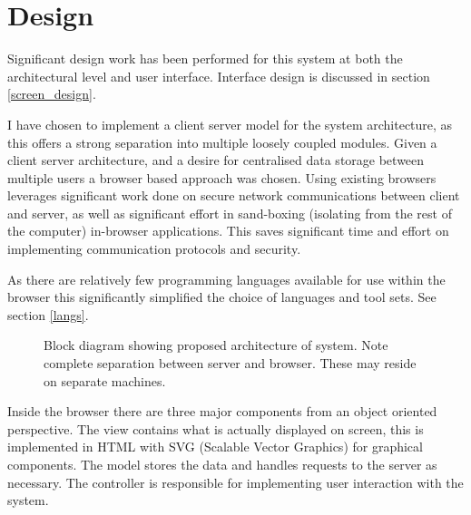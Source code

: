 \chapter{Design}\label{design}

Significant design work has been performed for this system at both the architectural level and user interface. Interface design is discussed in section \ref{screen_design}. 

I have chosen to implement a client server model for the system architecture, as this offers a strong separation into multiple loosely coupled modules. Given a client server architecture, and a desire for centralised data storage between multiple users a browser based approach was chosen. Using existing browsers leverages significant work done on secure network communications between client and server, as well as significant effort in sand-boxing (isolating from the rest of the computer) in-browser applications. This saves significant time and effort on implementing communication protocols and security. 

As there are relatively few programming languages available for use within the browser this significantly simplified the choice of languages and tool sets. See section \ref{langs}.

\begin{figure}[tbh]
\caption{\protect\label{spiral_plan}Block diagram showing proposed architecture of system. Note complete separation between server and browser. These may reside on separate machines.}
\end{figure}

Inside the browser there are three major components from an object oriented perspective. The view contains what is actually displayed on screen, this is implemented in HTML with SVG (Scalable Vector Graphics) for graphical components. The model stores the data and handles requests to the server as necessary. The controller is responsible for implementing user interaction with the system.


